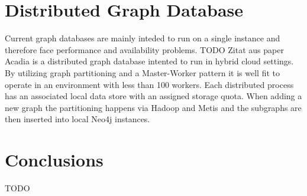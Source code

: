 \documentclass{sig-alternate}
\begin{document}
\section{Distributed Graph Database}
Current graph databases are mainly inteded to run on a single instance and therefore
face performance and availability problems. TODO Zitat aus paper 
Acadia is a distributed graph database intented to run in hybrid cloud settings.
By utilizing graph partitioning and a Master-Worker pattern it is well fit to 
operate in an environment with less than 100 workers.
Each distributed process has an associated local data store with an assigned storage quota.
When adding a new graph the partitioning happens via Hadoop and Metis and the subgraphs are then inserted into local
Neo4j instances.

\section{Conclusions}
TODO


%

%
%
\end{document}
